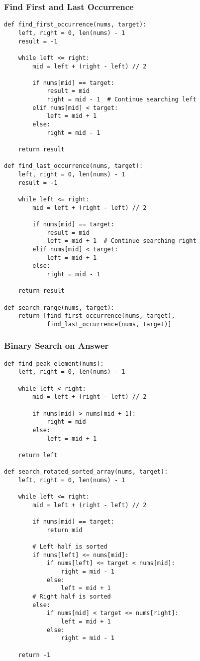 \documentclass[10pt,a4paper]{article}
\begin{document}
\subsubsection{Find First and Last Occurrence}
\begin{lstlisting}
def find_first_occurrence(nums, target):
    left, right = 0, len(nums) - 1
    result = -1

    while left <= right:
        mid = left + (right - left) // 2

        if nums[mid] == target:
            result = mid
            right = mid - 1  # Continue searching left
        elif nums[mid] < target:
            left = mid + 1
        else:
            right = mid - 1

    return result

def find_last_occurrence(nums, target):
    left, right = 0, len(nums) - 1
    result = -1

    while left <= right:
        mid = left + (right - left) // 2

        if nums[mid] == target:
            result = mid
            left = mid + 1  # Continue searching right
        elif nums[mid] < target:
            left = mid + 1
        else:
            right = mid - 1

    return result

def search_range(nums, target):
    return [find_first_occurrence(nums, target),
            find_last_occurrence(nums, target)]
\end{lstlisting}

\subsubsection{Binary Search on Answer}
\begin{lstlisting}
def find_peak_element(nums):
    left, right = 0, len(nums) - 1

    while left < right:
        mid = left + (right - left) // 2

        if nums[mid] > nums[mid + 1]:
            right = mid
        else:
            left = mid + 1

    return left

def search_rotated_sorted_array(nums, target):
    left, right = 0, len(nums) - 1

    while left <= right:
        mid = left + (right - left) // 2

        if nums[mid] == target:
            return mid

        # Left half is sorted
        if nums[left] <= nums[mid]:
            if nums[left] <= target < nums[mid]:
                right = mid - 1
            else:
                left = mid + 1
        # Right half is sorted
        else:
            if nums[mid] < target <= nums[right]:
                left = mid + 1
            else:
                right = mid - 1

    return -1
\end{lstlisting}
\end{document}
